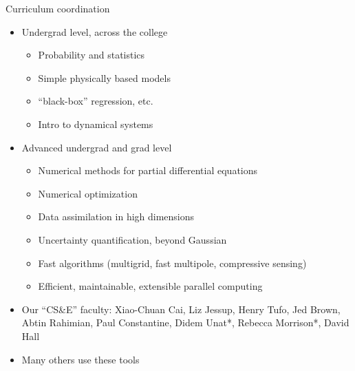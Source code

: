 \documentclass{beamer}
\begin{document}
\begin{frame}{Curriculum coordination}
  \begin{itemize}
  \item Undergrad level, across the college
    \begin{itemize}
    \item Probability and statistics
    \item Simple physically based models
    \item ``black-box'' regression, etc.
    \item Intro to dynamical systems
    \end{itemize}
  \item Advanced undergrad and grad level
    \begin{itemize}
    \item Numerical methods for partial differential equations
    \item Numerical optimization
    \item Data assimilation in high dimensions
    \item Uncertainty quantification, beyond Gaussian
    \item Fast algorithms (multigrid, fast multipole, compressive sensing)
    \item Efficient, maintainable, extensible parallel computing
    \end{itemize}
  \item Our ``CS\&E'' faculty: Xiao-Chuan Cai, Liz Jessup, Henry Tufo, Jed Brown, Abtin Rahimian, Paul Constantine, Didem Unat*, Rebecca Morrison*, David Hall
  \item Many others use these tools
  \end{itemize}
\end{frame}
\end{document}
